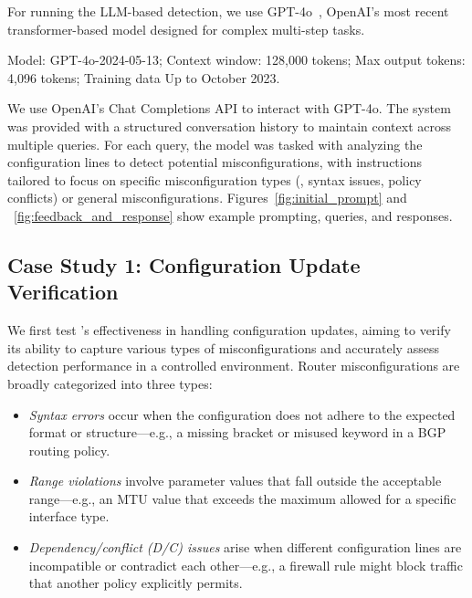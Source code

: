 For running the LLM-based detection, we use GPT-4o~\cite{openai_gpt4o}, OpenAI's most recent transformer-based model designed for complex multi-step tasks.

 Model: GPT-4o-2024-05-13; Context window: 128,000 tokens; Max output tokens: 4,096 tokens; Training data Up to October 2023.

We use OpenAI’s Chat Completions API to interact with GPT-4o. The system was provided with a structured conversation history to maintain context across multiple queries. For each query, the model was tasked with analyzing the configuration lines to detect potential misconfigurations, with instructions tailored to focus on specific misconfiguration types (\eg, syntax issues, policy conflicts) or general misconfigurations. Figures~\ref{fig:initial_prompt} and ~\ref{fig:feedback_and_response}
show example prompting, queries, and responses.

\subsection{Case Study 1: Configuration Update Verification}
We first test \sysname{}'s effectiveness in handling configuration updates, aiming to verify its ability to capture various types of misconfigurations and accurately assess detection performance in a controlled environment.
Router misconfigurations are broadly categorized into three types:
\begin{itemize}
    \item \textit{Syntax errors} occur when the configuration does not adhere to the expected format or structure---e.g., a missing bracket or misused keyword in a BGP routing policy.
    \item \textit{Range violations} involve parameter values that fall outside the acceptable range---e.g., an MTU value that exceeds the maximum allowed for a specific interface type.
    \item \textit{Dependency/conflict (D/C) issues} arise when different configuration lines are incompatible or contradict each other---e.g., a firewall rule might block traffic that another policy explicitly permits.
\end{itemize}


